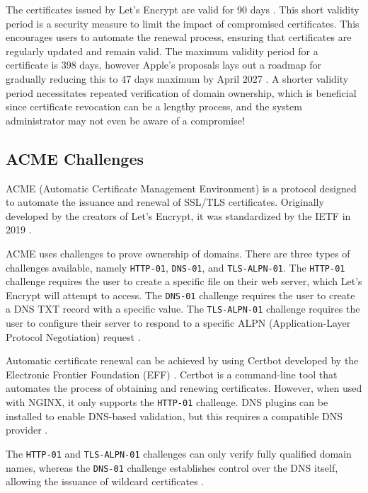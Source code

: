 The certificates issued by Let's Encrypt are valid for 90 days \cite{letsencrypt_faq}. This short validity period is a security measure to limit the impact of compromised certificates. This encourages users to automate the renewal process, ensuring that certificates are regularly updated and remain valid. The maximum validity period for a certificate is 398 days, however Apple's proposals lays out a roadmap for gradually reducing this to 47 days maximum by April 2027 \cite{globalsign_certificate_lifespans}. A shorter validity period necessitates repeated verification of domain ownership, which is beneficial since certificate revocation can be a lengthy process, and the system administrator may not even be aware of a compromise!

\subsection{ACME Challenges}\label{sec:acme_challenges}
ACME (Automatic Certificate Management Environment) is a protocol designed to automate the issuance and renewal of SSL/TLS certificates. Originally developed by the creators of Let's Encrypt, it was standardized by the IETF in 2019 \parencite{letsencrypt_isrg_anniversary}.

ACME uses challenges to prove ownership of domains. There are three types of challenges available, namely \texttt{HTTP-01}, \texttt{DNS-01}, and \texttt{TLS-ALPN-01}. The \texttt{HTTP-01} challenge requires the user to create a specific file on their web server, which Let's Encrypt will attempt to access. The \texttt{DNS-01} challenge requires the user to create a DNS TXT record with a specific value. The \texttt{TLS-ALPN-01} challenge requires the user to configure their server to respond to a specific ALPN (Application-Layer Protocol Negotiation) request \cite{letsencrypt_challenge_types}.

Automatic certificate renewal can be achieved by using Certbot developed by the Electronic Frontier Foundation (EFF) \parencite{letsencrypt_peter_eckersley}. Certbot is a command-line tool that automates the process of obtaining and renewing certificates. However, when used with NGINX, it only supports the \texttt{HTTP-01} challenge. DNS plugins can be installed to enable DNS-based validation, but this requires a compatible DNS provider \parencite{certbot_plugins}.

The \texttt{HTTP-01} and \texttt{TLS-ALPN-01} challenges can only verify fully qualified domain names, whereas the \texttt{DNS-01} challenge establishes control over the DNS itself, allowing the issuance of wildcard certificates \cite{letsencrypt_challenge_types}.


